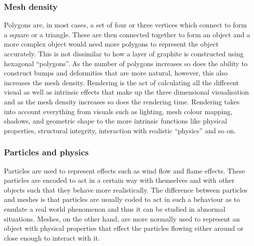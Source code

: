 \subsubsection{Mesh density}
Polygons are, in most cases, a set of four or three vertices which connect to form a square or a triangle. These are then connected together to form an object and a more complex object would need more polygons to represent the object accurately. This is not dissimilar to how a layer of graphite is constructed using hexagonal ``polygons''. As the number of polygons increases so does the ability to construct bumps and deformities that are more natural, however, this also increases the mesh density. Rendering is the act of calculating all the different visual as well as intrinsic effects that make up the three dimensional visualisation and as the mesh density increases so does the rendering time. Rendering takes into account everything from visuals such as lighting, mesh colour mapping, shadows, and geometric shape to the more intrinsic functions like physical properties, structural integrity, interaction with realistic ``physics'' and so on.  

\subsubsection{Particles and physics}
Particles are used to represent effects such as wind flow and flame effects. These particles are encoded to act in a certain way with themselves and with other objects such that they behave more realistically. The difference between particles and meshes is that particles are usually coded to act in such a behaviour as to emulate a real world phenomenon and thus it can be studied in abnormal situations. Meshes, on the other hand, are more normally used to represent an object with physical properties that effect the particles flowing either around or close enough to interact with it.

